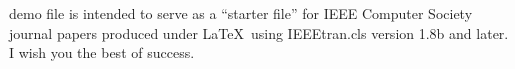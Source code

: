 \documentclass[10pt,journal,compsoc]{IEEEtran}
\begin{document}
%
\IEEEpeerreviewmaketitle







% 
% 
% 
% 
 demo file is intended to serve as a ``starter file''
for IEEE Computer Society journal papers produced under \LaTeX\ using
IEEEtran.cls version 1.8b and later.
I wish you the best of success.
\end{document}
